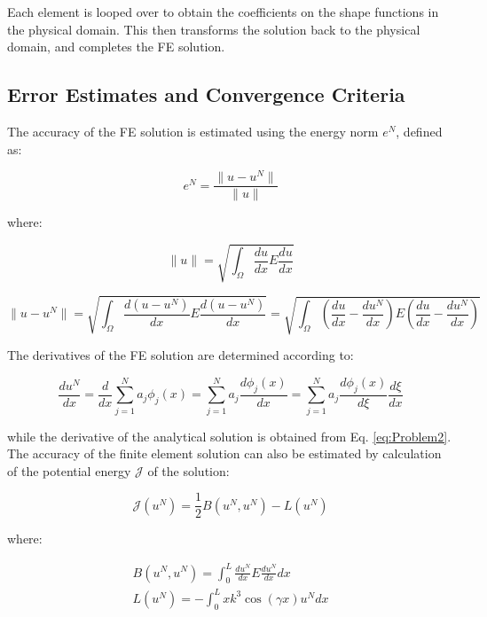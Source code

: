 \documentclass[10pt]{article}
\begin{document}
Each element is looped over to obtain the coefficients on the shape functions in the physical domain. This then transforms the solution back to the physical domain, and completes the FE solution.

\subsection{Error Estimates and Convergence Criteria}

The accuracy of the FE solution is estimated using the energy norm \(e^N\), defined as:

\begin{equation}
e^N=\frac{\|u-u^N\|}{\|u\|}
\end{equation}

where:

\begin{equation}
\|u\|=\sqrt{\int_{\Omega}^{}\frac{du}{dx}E\frac{du}{dx}}
\end{equation}

\begin{equation}
\|u-u^N\|=\sqrt{\int_{\Omega}^{}\frac{d(u-u^N)}{dx}E\frac{d(u-u^N)}{dx}}=\sqrt{\int_{\Omega}^{}\left(\frac{du}{dx}-\frac{du^N}{dx}\right)E\left(\frac{du}{dx}-\frac{du^N}{dx}\right)}
\end{equation}

The derivatives of the FE solution are determined according to:

\begin{equation}
\frac{du^N}{dx}=\frac{d}{dx}\sum_{j=1}^{N}a_j\phi_j(x)=\sum_{j=1}^{N}a_j\frac{d\phi_j(x)}{dx}=\sum_{j=1}^{N}a_j\frac{d\phi_j(x)}{d\xi}\frac{d\xi}{dx}
\end{equation}

while the derivative of the analytical solution is obtained from Eq. \eqref{eq:Problem2}. The accuracy of the finite element solution can also be estimated by calculation of the potential energy \(\mathscr{J}\) of the solution:

\begin{equation}
\label{eq:PotentialEnergy}
\mathscr{J}(u^N)=\frac{1}{2}B(u^N, u^N)-L(u^N)
\end{equation}

where:

\begin{equation}
\begin{aligned}
B(u^N, u^N)=\int_{0}^{L}\frac{du^N}{dx}E\frac{du^N}{dx}dx\\
L(u^N)=-\int_{0}^{L}xk^3\cos{(\gamma x)}u^Ndx\\
\end{aligned}
\end{equation}
\end{document}
